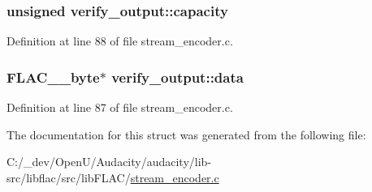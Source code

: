 \subsubsection[{\texorpdfstring{capacity}{capacity}}]{\setlength{\rightskip}{0pt plus 5cm}unsigned verify\+\_\+output\+::capacity}\hypertarget{structverify__output_a8f91830b856ad6135e69e72986717257}{}\label{structverify__output_a8f91830b856ad6135e69e72986717257}


Definition at line 88 of file stream\+\_\+encoder.\+c.

\subsubsection[{\texorpdfstring{data}{data}}]{ {\bf F\+L\+A\+C\+\_\+\+\_\+byte}$\ast$ verify\+\_\+output\+::data}\hypertarget{structverify__output_a8fc7345f6fe84007dedfb5848a015d63}{}\label{structverify__output_a8fc7345f6fe84007dedfb5848a015d63}


Definition at line 87 of file stream\+\_\+encoder.\+c.



The documentation for this struct was generated from the following file\+:\begin{DoxyCompactItemize}
\item 
C\+:/\+\_\+dev/\+Open\+U/\+Audacity/audacity/lib-\/src/libflac/src/lib\+F\+L\+A\+C/\hyperlink{stream__encoder_8c}{stream\+\_\+encoder.\+c}\end{DoxyCompactItemize}
